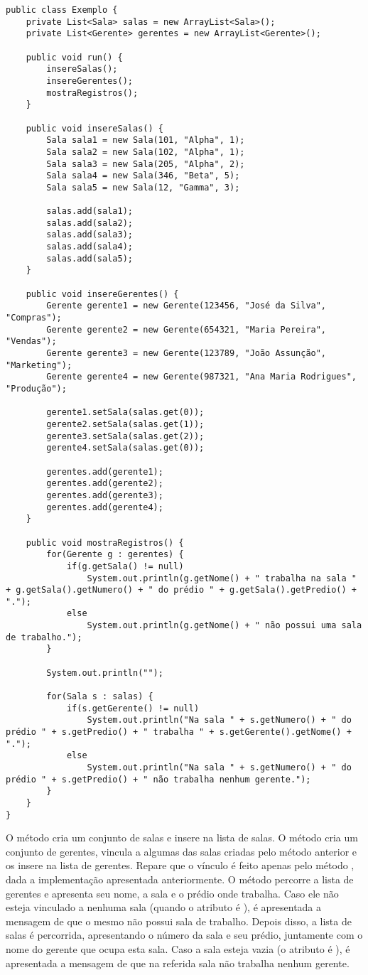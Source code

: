 \begin{verbatim}
public class Exemplo {
	private List<Sala> salas = new ArrayList<Sala>();
	private List<Gerente> gerentes = new ArrayList<Gerente>();

	public void run() {
		insereSalas();
		insereGerentes();
		mostraRegistros();
	}

	public void insereSalas() {
		Sala sala1 = new Sala(101, "Alpha", 1);
		Sala sala2 = new Sala(102, "Alpha", 1);
		Sala sala3 = new Sala(205, "Alpha", 2);
		Sala sala4 = new Sala(346, "Beta", 5);
		Sala sala5 = new Sala(12, "Gamma", 3);

		salas.add(sala1);
		salas.add(sala2);
		salas.add(sala3);
		salas.add(sala4);
		salas.add(sala5);
	}

	public void insereGerentes() {
		Gerente gerente1 = new Gerente(123456, "José da Silva", "Compras");
		Gerente gerente2 = new Gerente(654321, "Maria Pereira", "Vendas");
		Gerente gerente3 = new Gerente(123789, "João Assunção", "Marketing");
		Gerente gerente4 = new Gerente(987321, "Ana Maria Rodrigues", "Produção");

		gerente1.setSala(salas.get(0));
		gerente2.setSala(salas.get(1));
		gerente3.setSala(salas.get(2));
		gerente4.setSala(salas.get(0));

		gerentes.add(gerente1);
		gerentes.add(gerente2);
		gerentes.add(gerente3);
		gerentes.add(gerente4);
	}

	public void mostraRegistros() {
		for(Gerente g : gerentes) {
			if(g.getSala() != null)
				System.out.println(g.getNome() + " trabalha na sala " + g.getSala().getNumero() + " do prédio " + g.getSala().getPredio() + ".");
			else
				System.out.println(g.getNome() + " não possui uma sala de trabalho.");
		}

		System.out.println("");

		for(Sala s : salas) {
			if(s.getGerente() != null)
				System.out.println("Na sala " + s.getNumero() + " do prédio " + s.getPredio() + " trabalha " + s.getGerente().getNome() + ".");
			else
				System.out.println("Na sala " + s.getNumero() + " do prédio " + s.getPredio() + " não trabalha nenhum gerente.");
		}
	}
}
\end{verbatim}

O método  cria um conjunto de salas e insere na lista de salas. O método  cria um conjunto de gerentes, vincula a algumas das salas criadas pelo método anterior e os insere na lista de gerentes. Repare que o vínculo é feito apenas pelo método , dada a implementação apresentada anteriormente. O método  percorre a lista de gerentes e apresenta seu nome, a sala e o prédio onde trabalha. Caso ele não esteja vinculado a nenhuma sala (quando o atributo  é ), é apresentada a mensagem de que o mesmo não possui sala de trabalho. Depois disso, a lista de salas é percorrida, apresentando o número da sala e seu prédio, juntamente com o nome do gerente que ocupa esta sala. Caso a sala esteja vazia (o atributo  é ), é apresentada a mensagem de que na referida sala não trabalha nenhum gerente.

